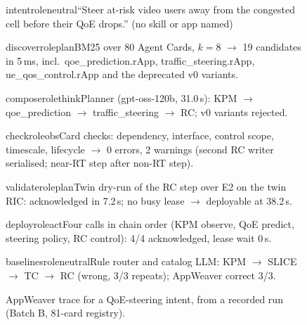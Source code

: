 \begin{figure}[htbp]
\centering
\begin{awstep}{intent}{roleneutral}``Steer at-risk video users away from the congested cell before their QoE drops.'' (no skill or app named)\end{awstep}
\begin{awstep}{discover}{roleplan}BM25 over 80 Agent Cards, $k{=}8$ $\rightarrow$ 19 candidates in 5\,ms, incl.\ qoe\_prediction.rApp, traffic\_steering.rApp, ue\_qos\_control.rApp and the deprecated v0 variants.\end{awstep}
\begin{awstep}{compose}{rolethink}Planner (gpt-oss-120b, 31.0\,s): KPM $\rightarrow$ qoe\_prediction $\rightarrow$ traffic\_steering $\rightarrow$ RC; v0 variants rejected.\end{awstep}
\begin{awstep}{check}{roleobs}Card checks: dependency, interface, control scope, timescale, lifecycle $\rightarrow$ 0 errors, 2 warnings (second RC writer serialised; near-RT step after non-RT step).\end{awstep}
\begin{awstep}{validate}{roleplan}Twin dry-run of the RC step over E2 on the twin RIC: acknowledged in 7.2\,s; no busy lease $\rightarrow$ deployable at 38.2\,s.\end{awstep}
\begin{awstep}{deploy}{roleact}Four calls in chain order (KPM observe, QoE predict, steering policy, RC control): 4/4 acknowledged, lease wait 0\,s.\end{awstep}
\begin{awstep}{baselines}{roleneutral}Rule router and catalog LLM: KPM $\rightarrow$ SLICE $\rightarrow$ TC $\rightarrow$ RC (wrong, 3/3 repeats); AppWeaver correct 3/3.\end{awstep}
\caption{AppWeaver trace for a QoE-steering intent, from a recorded run (Batch B, 81-card registry).}
\label{fig:trace}
\end{figure}
